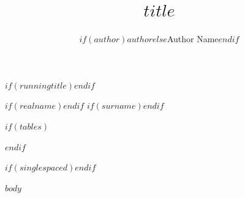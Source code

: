 \title{$title$}
$if(runningtitle)$$endif$
\author{$if(author)$$author$$else$Author Name$endif$}
$if(realname)$$endif$
$if(surname)$$endif$

\address{$if(address)$$address$\\$endif$$if(citystateline)$$citystateline$\\$endif$$if(phonenumber)$$phonenumber$\\$endif$$if(email)$$email$$endif$}


\providecommand{\tightlist}{%
  \setlength{\itemsep}{0pt}\setlength{\parskip}{0pt}}

$if(tables)$
\usepackage{longtable,booktabs,array}
\usepackage{calc}
\makeatletter
{}
\makeatother
\usepackage{caption}
$endif$



$if(singlespaced)$\singlespacing$endif$

$body$


